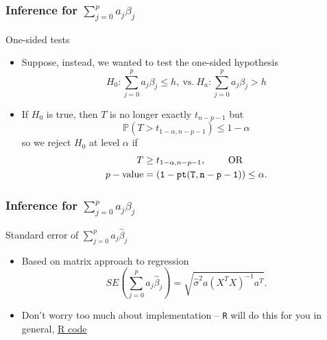 \documentclass[handout]{beamer}
\newcommand{\Pp}{\mathbb{P}}
\newcommand{\RR}{{\tt R} \;}
\begin{document}
   \begin{frame} \frametitle{Inference for $\sum_{j=0}^p a_j \beta_j$}

   \begin{block}
   {One-sided tests}
   \begin{itemize}
   \item Suppose, instead, we wanted to test the one-sided hypothesis
   $$H_0:\sum_{j=0}^p a_j\beta_j \leq  h, \  \text{vs.} \ H_a: \sum_{j=0}^p a_j\beta_j >  h$$
   \item If $H_0$ is true, then $T$ is no longer exactly $t_{n-p-1}$
   but
   $$
   \Pp \left(T > t_{1-\alpha, n-p-1}\right) \leq 1 - \alpha$$
   so we reject $H_0$ at level $\alpha$ if
   $$
   \begin{aligned}
   T &\geq t_{1-\alpha,n-p-1}, \qquad \text{ OR} \\
   p-\text{value} &= {\tt (1-pt(T, n-p-1))} \leq \alpha.
   \end{aligned}
   $$
   \end{itemize}
   \end{block}
   \end{frame}


   \begin{frame} \frametitle{Inference for $\sum_{j=0}^p a_j \beta_j$}

   \begin{block}
   {Standard error of $\sum_{j=0}^p a_j \widehat{\beta}_j$}
   \begin{itemize}
   \item Based on matrix approach to regression
   $$
   SE\left(\sum_{j=0}^p a_j\widehat{\beta}_j \right) = \sqrt{\widehat{\sigma}^2 a (X^TX)^{-1} a^T}.$$

   \item Don't worry too much about implementation -- \RR will do this for you in general, \href{http://stats191.stanford.edu/multiple.html}{R code}
   \end{itemize}
   \end{block}
   \end{frame}

\end{document}
